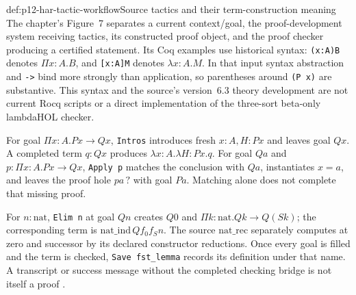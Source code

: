 \begin{hbdefinition}{def:p12-har-tactic-workflow}{Source tactics and their term-construction meaning}
The chapter's Figure~7 separates a current context/goal, the
proof-development system receiving tactics, its constructed proof object,
and the proof checker producing a certified statement. Its Coq examples
use historical syntax: \texttt{(x:A)B} denotes \(\Pi x:A.B\),
and \texttt{[x:A]M} denotes \(\lambda x:A.M\). In that input
syntax abstraction and \texttt{->} bind more strongly than application,
so parentheses around \texttt{(P x)} are substantive. This syntax and
the source's version~6.3 theory development are not current Rocq scripts
or a direct implementation of the three-sort beta-only lambdaHOL checker.

For goal \(\Pi x:A.Px\to Qx\), \texttt{Intros} introduces
fresh \(x:A,H:Px\) and leaves goal \(Qx\). A completed term
\(q:Qx\) produces \(\lambda x:A.\lambda H:Px.q\).
For goal \(Qa\) and
\(p:\Pi x:A.Px\to Qx\), \texttt{Apply p} matches the
conclusion with \(Qa\), instantiates \(x=a\), and leaves
the proof hole \(pa\,?\) with goal \(Pa\). Matching alone
does not complete that missing proof.

For \(n:\mathrm{nat}\), \texttt{Elim n} at goal \(Qn\)
creates \(Q0\) and \(\Pi k:\mathrm{nat}.Qk\to Q(Sk)\);
the corresponding term is \(\mathrm{nat\_ind}\,Q f_0 f_S n\).
The source \(\mathrm{nat\_rec}\) separately computes at zero
and successor by its declared constructor reductions. Once every goal is
filled and the term is checked, \texttt{Save fst\_lemma} records its
definition under that name. A transcript or success message without the
completed checking bridge is not itself a proof
\cite[pp.~1211--1214, Fig.~7]{BarendregtGeuvers2001}.
\end{hbdefinition}

